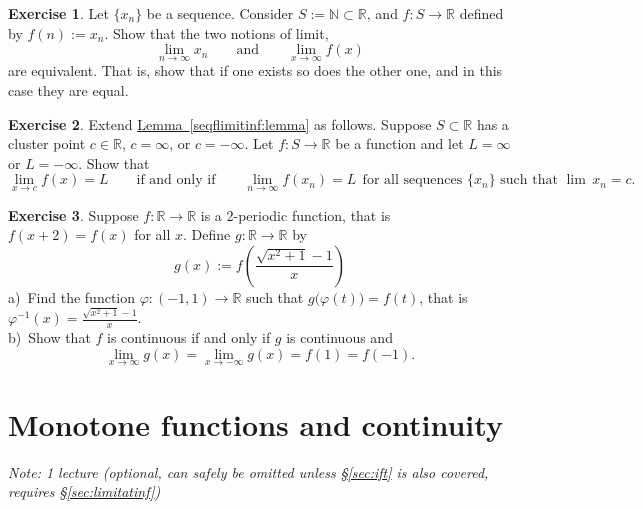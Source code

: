 \documentclass[12pt]{book}
\newcommand{\R}{{\mathbb{R}}}
\newcommand{\N}{{\mathbb{N}}}
\newcommand{\sectionnotes}[1]{\noindent \emph{Note: #1} \medskip \par}
\newcommand{\sectionnewpage}{\clearpage}
\theoremstyle{plain}
\theoremstyle{remark}
\theoremstyle{definition}
\theoremstyle{exercise}
\newtheorem{exercise}{Exercise}[section]
\theoremstyle{example}
\newcommand{\sectionref}[1]{\hyperref[#1]{\S\ref*{#1}}}
\newcommand{\lemmaref}[1]{\hyperref[#1]{Lemma~\ref*{#1}}}
\begin{document}
\begin{exercise}
Let $\{ x_n \}$ be a sequence.  Consider $S := \N \subset \R$, and
$f \colon S \to \R$ defined by $f(n) := x_n$.  Show that
the two notions of limit,
\begin{equation*}
\lim_{n\to\infty} x_n \qquad \text{and} \qquad
\lim_{x\to\infty} f(x) 
\end{equation*}
are equivalent.  That is, show that if one exists so does
the other one, and in this case they are equal.
\end{exercise}

\begin{exercise}
Extend \lemmaref{seqflimitinf:lemma} as follows.
Suppose $S \subset \R$ has a cluster point $c \in \R$, $c = \infty$,
or $c = -\infty$.  Let $f \colon S \to \R$ be a function and let
$L = \infty$ or $L = -\infty$.  Show that
\begin{equation*}
\lim_{x\to c} f(x) = L \qquad \text{if and only if} \qquad
\lim_{n\to\infty} f(x_n) = L ~~\text{for all sequences $\{ x_n \}$ such that $\lim\, x_n =
c$} .
\end{equation*}
\end{exercise}

\begin{exercise}
Suppose $f \colon \R \to \R$ is a 2-periodic function, that is $f(x +2) =
f(x)$ for all $x$.  Define $g \colon \R \to \R$ by 
\begin{equation*}
g(x) := f\left(\frac{\sqrt{x^2+1}-1}{x}\right)
\end{equation*}
a)~Find the function $\varphi \colon (-1,1) \to \R$ such that
$g\bigl(\varphi(t)\bigr) = f(t)$, that is $\varphi^{-1}(x) = 
\frac{\sqrt{x^2+1}-1}{x}$.
\\
b)~Show that $f$ is continuous if and only if $g$ is continuous and
\begin{equation*}
\lim_{x \to \infty} g(x) = 
\lim_{x \to -\infty} g(x) = 
f(1) = f(-1) .
\end{equation*}
\end{exercise}


\sectionnewpage
\section{Monotone functions and continuity}
\label{sec:monotonefunc}

\sectionnotes{1 lecture (optional, can safely be omitted unless
\sectionref{sec:ift} is also covered, requires \sectionref{sec:limitatinf})}
\end{document}
